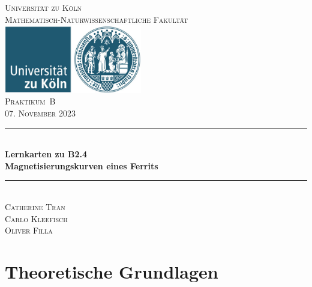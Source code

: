 \documentclass[12pt,a4paper]{scrartcl}
\numberwithin{equation}{section} %
\newcommand{\HRule}{\rule{\linewidth}{0.7mm}}
\begin{document}
\begin{titlepage}
	\pagestyle{empty}

	\begin{center}

	\textsc{\LARGE Universität zu Köln }\\ [0.4cm]
	\textsc{Mathematisch-Naturwissenschaftliche Fakultät} \\[1.5cm]

	\includegraphics[width=0.45\textwidth]{../media/uni.jpg}\\[1.5cm]  %

	\textsc{\Large Praktikum~B}\\[2mm]
	\textsc{07. November 2023}\\[10mm]
	\HRule \\[0.4cm]

		{	\Huge \bfseries Lernkarten zu B2.4}\\[0.4cm]
			{	\huge \bfseries Magnetisierungskurven eines Ferrits}\\[0.3cm]
	
	\HRule \\[3cm]

			\textsc{\Large Catherine Tran } \\[3pt]
		\textsc{\Large Carlo Kleefisch } \\[3pt]
		\textsc{\Large Oliver Filla } \\[3pt]
		
	\end{center}
\end{titlepage}

\newpage
\tableofcontents
\newpage

\hypertarget{theoretische-grundlagen}{%
\section{Theoretische Grundlagen}\label{theoretische-grundlagen}}
\end{document}
